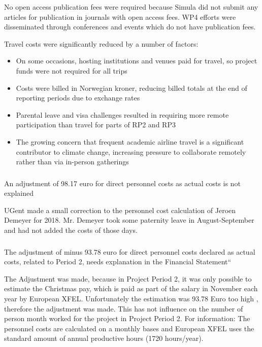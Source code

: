 No open access publication fees were required because Simula did not submit any articles for publication in journals with open access fees.
WP4 efforts were disseminated through conferences and events which do not have publication fees.

Travel costs were significantly reduced by a number of factors:
\begin{itemize}
  \item On some occasions, hosting institutions and venues paid for travel, so project funds were not required for all trips
  \item Costs were billed in Norwegian kroner, reducing billed totals at the end of reporting periods due to exchange rates
  \item Parental leave and visa challenges resulted in requiring more remote participation
    than travel for parts of RP2 and RP3
  \item The growing concern that frequent academic airline travel is a significant contributor to climate change,
    increasing pressure to collaborate remotely rather than via in-person gatherings
\end{itemize}

\subsubsection{}
\begin{EUcomment}
An adjustment of 98.17 euro for direct personnel costs as actual costs is not explained 
\end{EUcomment}
UGent made a small correction to the personnel cost calculation of Jeroen Demeyer for 2018. Mr. Demeyer took some paternity leave in August-September and had not added the costs of those days.

\subsubsection{}

\begin{EUcomment}
The adjustment of minus 93.78 euro for direct personnel costs declared as actual costs, related to Period 2, needs explanation in the 
Financial Statement“
\end{EUcomment}

The Adjustment was made, because in Project Period 2, it was only possible to estimate the Christmas pay, which is paid as part of the salary in November each year by European XFEL. Unfortunately the estimation was 93.78 Euro too high , therefore the adjustment was made. This has not influence on the number of person month worked for the project in Project Period 2. For information: The personnel costs are calculated on a monthly bases and European XFEL uses the standard amount of  annual productive hours (1720 hours/year).

